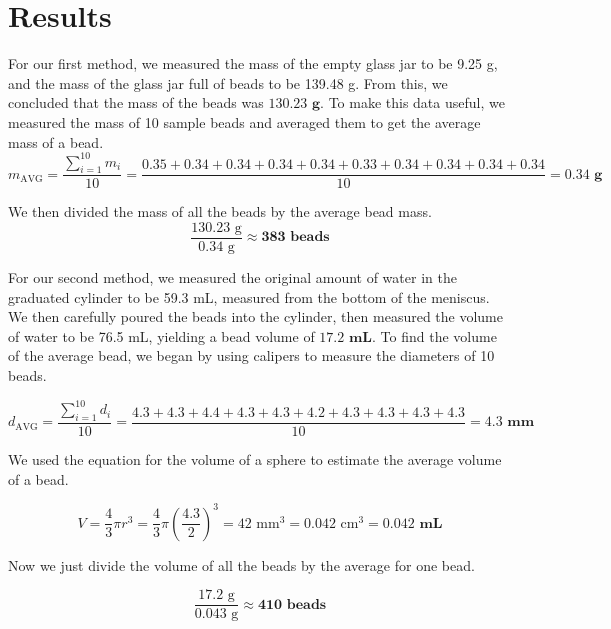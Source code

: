 \documentclass[12pt,letterpaper]{article}
\begin{document}
\section{Results}

For our first method, we measured the mass of the empty glass jar to be 9.25 g, and the mass of the glass jar full of beads to be 139.48 g. From this, we concluded that the mass of the beads was $\mathbf{130.23}\textbf{ g}$. To make this data useful, we measured the mass of 10 sample beads and averaged them to get the average mass of a bead.
\begin{equation*}
    m_\text{AVG}=\frac{\sum_{i=1}^{10} m_i}{10} = \frac{0.35+0.34+0.34+0.34+0.34+0.33+0.34+0.34+0.34+0.34}{10}=\mathbf{0.34} \textbf{ g}
\end{equation*}

We then divided the mass of all the beads by the average bead mass.
\begin{equation*}
    \frac{130.23 \text{ g}}{0.34 \text{ g}}\approx \mathbf{383 \textbf{ beads}}
\end{equation*}

For our second method, we measured the original amount of water in the graduated cylinder to be 59.3 mL, measured from the bottom of the meniscus. We then carefully poured the beads into the cylinder, then measured the volume of water to be 76.5 mL, yielding a bead volume of $\mathbf{17.2} \textbf{ mL}$. To find the volume of the average bead, we began by using calipers to measure the diameters of 10 beads.

\begin{equation*}
    d_\text{AVG}=\frac{\sum_{i=1}^{10} d_i}{10} = \frac{4.3+4.3+4.4+4.3+4.3+4.2+4.3+4.3+4.3+4.3}{10}=\mathbf{4.3} \textbf{ mm}
\end{equation*}

We used the equation for the volume of a sphere to estimate the average volume of a bead.

\begin{equation*}
    V=\frac{4}{3}\pi r^3 = \frac{4}{3}\pi \left(\frac{4.3}{2}\right)^3 = 42 \text{ mm}^3 = 0.042 \text{ cm}^3 = \mathbf{0.042}\textbf{ mL}
\end{equation*}

Now we just divide the volume of all the beads by the average for one bead.

\begin{equation*}
    \frac{17.2 \text{ g}}{0.043 \text{ g}}\approx \mathbf{410 \textbf{ beads}}
\end{equation*}
\end{document}
